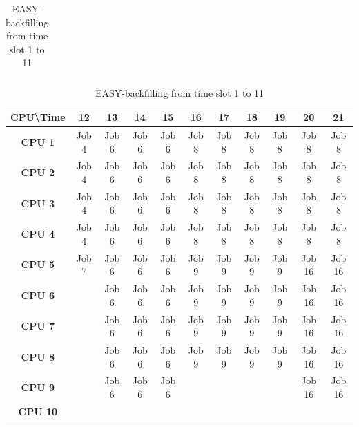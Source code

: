 \documentclass[11pt]{article}
\begin{document}
\begin{table}[]
\begin{tabular}{|c|c|c|c|c|c|c|c|c|c|c|c|}
\end{tabular}
\caption{\label{EASY1}EASY-backfilling from time slot 1 to 11}
\vspace{1cm}
\begin{tabular}{|c|c|c|c|c|c|c|c|c|c|c|}
\hline
\textbf{CPU\textbackslash{}Time} & \textbf{12} & \textbf{13} & \textbf{14} & \textbf{15} & \textbf{16} & \textbf{17} & \textbf{18} & \textbf{19} & \textbf{20} & \textbf{21} \\ \hline
\textbf{CPU 1}                   & Job 4       & Job 6       & Job 6       & Job 6       & Job 8       & Job 8       & Job 8       & Job 8       & Job 8       & Job 8       \\ \hline
\textbf{CPU 2}                   & Job 4       & Job 6       & Job 6       & Job 6       & Job 8       & Job 8       & Job 8       & Job 8       & Job 8       & Job 8       \\ \hline
\textbf{CPU 3}                   & Job 4       & Job 6       & Job 6       & Job 6       & Job 8       & Job 8       & Job 8       & Job 8       & Job 8       & Job 8       \\ \hline
\textbf{CPU 4}                   & Job 4       & Job 6       & Job 6       & Job 6       & Job 8       & Job 8       & Job 8       & Job 8       & Job 8       & Job 8       \\ \hline
\textbf{CPU 5}                   & Job 7       & Job 6       & Job 6       & Job 6       & Job 9       & Job 9       & Job 9       & Job 9       & Job 16      & Job 16      \\ \hline
\textbf{CPU 6}                   &             & Job 6       & Job 6       & Job 6       & Job 9       & Job 9       & Job 9       & Job 9       & Job 16      & Job 16      \\ \hline
\textbf{CPU 7}                   &             & Job 6       & Job 6       & Job 6       & Job 9       & Job 9       & Job 9       & Job 9       & Job 16      & Job 16      \\ \hline
\textbf{CPU 8}                   &             & Job 6       & Job 6       & Job 6       & Job 9       & Job 9       & Job 9       & Job 9       & Job 16      & Job 16      \\ \hline
\textbf{CPU 9}                   &             & Job 6       & Job 6       & Job 6       &             &             &             &             & Job 16      & Job 16      \\ \hline
\textbf{CPU 10}                  &             &             &             &             &             &             &             &             &             &             \\ \hline

\end{tabular}
\end{table}
\end{document}
